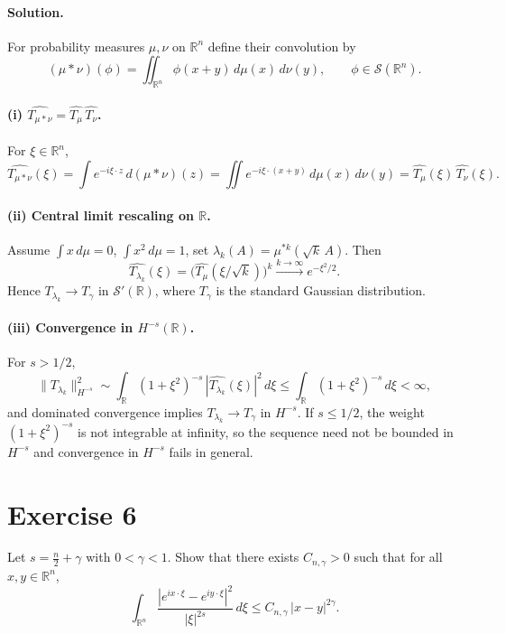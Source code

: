 \documentclass[12pt,a4paper]{article}
\theoremstyle{plain}
\theoremstyle{definition}
\theoremstyle{remark}
\theoremstyle{remark}
\begin{document}
\paragraph{Solution.}

\bigskip


For probability measures $\mu,\nu$ on $\mathbb R^n$ define their convolution by
\[
(\mu*\nu)(\phi)=\iint_{\mathbb R^n}\phi(x+y)\,d\mu(x)\,d\nu(y),\qquad \phi\in\mathcal S(\mathbb R^n).
\]

\paragraph{(i) $\widehat{T_{\mu*\nu}}=\widehat{T_\mu}\,\widehat{T_\nu}$.}
For $\xi\in\mathbb R^n$,
\[
\widehat{T_{\mu*\nu}}(\xi)
=\int e^{-i\xi\cdot z}\,d(\mu*\nu)(z)
=\iint e^{-i\xi\cdot(x+y)}\,d\mu(x)\,d\nu(y)
=\widehat{T_\mu}(\xi)\,\widehat{T_\nu}(\xi).
\]

\paragraph{(ii) Central limit rescaling on $\mathbb R$.}
Assume $\int x\,d\mu=0$, $\int x^2\,d\mu=1$, set $\lambda_k(A)=\mu^{*k}(\sqrt{k}\,A)$.
Then
\[
\widehat{T_{\lambda_k}}(\xi)=\big(\widehat{T_\mu}(\xi/\sqrt{k})\big)^k \xrightarrow{k\to\infty} e^{-\xi^2/2}.
\]
Hence $T_{\lambda_k}\to T_\gamma$ in $\mathcal S'(\mathbb R)$, where $T_\gamma$ is the standard Gaussian distribution.

\paragraph{(iii) Convergence in $H^{-s}(\mathbb R)$.}
For $s>1/2$,
\[
\|T_{\lambda_k}\|_{H^{-s}}^2 \sim \int_{\mathbb R}(1+\xi^2)^{-s}\,|\widehat{T_{\lambda_k}}(\xi)|^2\,d\xi
\le \int_{\mathbb R}(1+\xi^2)^{-s}\,d\xi<\infty,
\]
and dominated convergence implies $T_{\lambda_k}\to T_\gamma$ in $H^{-s}$.
If $s\le 1/2$, the weight $(1+\xi^2)^{-s}$ is not integrable at infinity, so the sequence need not be bounded in $H^{-s}$ and convergence in $H^{-s}$ fails in general.

\bigskip

\section*{Exercise 6}
Let $s=\frac n2+\gamma$ with $0<\gamma<1$. Show that there exists $C_{n,\gamma}>0$ such that for all $x,y\in\mathbb R^n$,
\[
\int_{\mathbb R^n}\frac{|e^{ix\cdot\xi}-e^{iy\cdot\xi}|^2}{|\xi|^{2s}}\,d\xi
\le C_{n,\gamma}\,|x-y|^{2\gamma}.
\]
\end{document}
